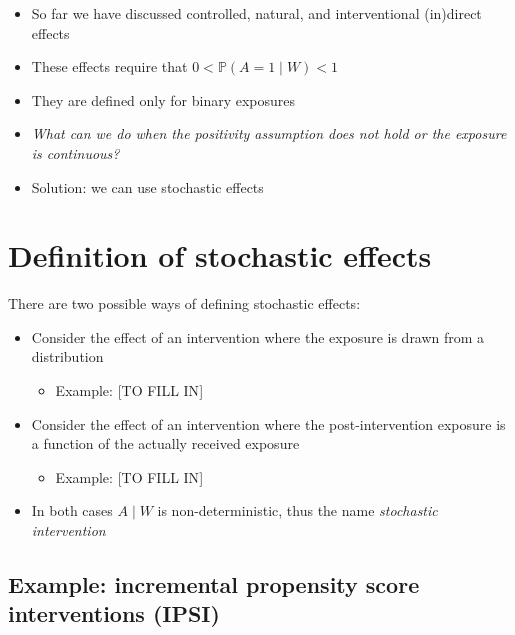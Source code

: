 \documentclass[
  12pt,
]{book}
\providecommand{\tightlist}{%
  \setlength{\itemsep}{0pt}\setlength{\parskip}{0pt}}
\theoremstyle{definition}
\theoremstyle{definition}
\theoremstyle{definition}
\renewcommand{\P}{\mathbb{P}}
\newcommand{\1}{\mathbbm{1}}
\begin{document}
\begin{itemize}
\tightlist
\item
  So far we have discussed controlled, natural, and interventional (in)direct effects
\item
  These effects require that \(0 < \P(A=1\mid W) < 1\)
\item
  They are defined only for binary exposures
\item
  \emph{What can we do when the positivity assumption does not hold or the exposure
  is continuous?}
\item
  Solution: we can use stochastic effects
\end{itemize}

\hypertarget{definition-of-stochastic-effects}{%
\section{Definition of stochastic effects}\label{definition-of-stochastic-effects}}

There are two possible ways of defining stochastic effects:

\begin{itemize}
\tightlist
\item
  Consider the effect of an intervention where the exposure is drawn from a
  distribution

  \begin{itemize}
  \tightlist
  \item
    Example: {[}TO FILL IN{]}
  \end{itemize}
\item
  Consider the effect of an intervention where the post-intervention exposure is
  a function of the actually received exposure

  \begin{itemize}
  \tightlist
  \item
    Example: {[}TO FILL IN{]}
  \end{itemize}
\item
  In both cases \(A\mid W\) is non-deterministic, thus the name \emph{stochastic intervention}
\end{itemize}

\hypertarget{example-incremental-propensity-score-interventions-ipsi-kennedy2018nonparametric}{%
\subsection*{\texorpdfstring{Example: incremental propensity score interventions (IPSI) \citep{kennedy2018nonparametric}}{Example: incremental propensity score interventions (IPSI) {[}@kennedy2018nonparametric{]}}}\label{example-incremental-propensity-score-interventions-ipsi-kennedy2018nonparametric}}
\end{document}
